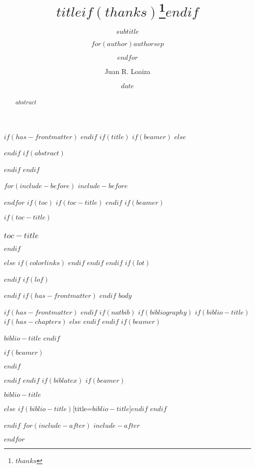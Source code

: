 \documentclass[
$if(fontsize)$
  $fontsize$,
  $else$
  9pt,
$endif$
$if(lang)$
  $babel-lang$
$endif$
$if(papersize)$
  $papersize$paper,
$endif$
$if(beamer)$
  ignorenonframetext,
$if(handout)$
  handout,
$endif$
$if(aspectratio)$
  aspectratio=$aspectratio$,
$endif$
$endif$
$for(classoption)$
  $classoption$$sep$,
$endfor$
]{$documentclass$}
\title{$title$$if(thanks)$\thanks{$thanks$}$endif$}
\subtitle{$subtitle$}
\author{$for(author)$$author$$sep$ \and $endfor$}
\author{Juan R. Loaiza}
\date{$date$}
\institute{$for(institute)$$institute$$sep$ \and $endfor$}
\institute{Departamento de Filosofía · Universidad Alberto Hurtado}
\newif\ifbibliography
\begin{document}
$if(has-frontmatter)$
\frontmatter
$endif$
$if(title)$
$if(beamer)$
\frame{\titlepage}
$else$
\maketitle
$endif$
$if(abstract)$
\begin{abstract}
  $abstract$
\end{abstract}
$endif$
$endif$

$for(include-before)$
$include-before$

$endfor$
$if(toc)$
$if(toc-title)$
\renewcommand*\contentsname{$toc-title$}
$endif$
$if(beamer)$
\begin{frame}
  $if(toc-title)$
  \frametitle{$toc-title$}
  $endif$
  \tableofcontents[hideallsubsections]
\end{frame}
$else$
{
    $if(colorlinks)$
    \hypersetup{linkcolor=$if(toccolor)$$toccolor$$else$$endif$}
    $endif$
    \setcounter{tocdepth}{$toc-depth$}
    \tableofcontents
  }
$endif$
$endif$
$if(lot)$
\listoftables
$endif$
$if(lof)$
\listoffigures
$endif$
$if(has-frontmatter)$
\mainmatter
$endif$
$body$

$if(has-frontmatter)$
\backmatter
$endif$
$if(natbib)$
$if(bibliography)$
$if(biblio-title)$
$if(has-chapters)$
\renewcommand\bibname{$biblio-title$}
$else$
\renewcommand\refname{$biblio-title$}
$endif$
$endif$
$if(beamer)$
\begin{frame}[allowframebreaks]{$biblio-title$}
  \bibliographytrue
  $endif$
  
  $if(beamer)$
\end{frame}
$endif$

$endif$
$endif$
$if(biblatex)$
$if(beamer)$
\begin{frame}[allowframebreaks]{$biblio-title$}
  \bibliographytrue
  \printbibliography[heading=none]
\end{frame}
$else$
\printbibliography$if(biblio-title)$[title=$biblio-title$]$endif$
$endif$

$endif$
$for(include-after)$
$include-after$

$endfor$
\end{document}
